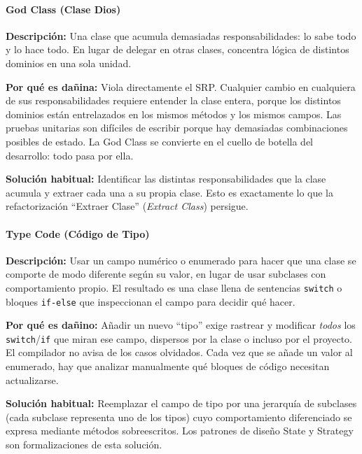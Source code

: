 \documentclass[11pt,a4paper]{article}
\newcommand{\code}[1]{\texttt{#1}}
\begin{document}
\label{sec:fund-god-class}
\paragraph{God Class (Clase Dios)}

\textbf{Descripción:} Una clase que acumula demasiadas responsabilidades:
lo sabe todo y lo hace todo.  En lugar de delegar en otras clases, concentra
lógica de distintos dominios en una sola unidad.

\textbf{Por qué es dañina:} Viola directamente el SRP.  Cualquier cambio en
cualquiera de sus responsabilidades requiere entender la clase entera, porque
los distintos dominios están entrelazados en los mismos métodos y los mismos
campos.  Las pruebas unitarias son difíciles de escribir porque hay demasiadas
combinaciones posibles de estado.  La God Class se convierte en el cuello de
botella del desarrollo: todo pasa por ella.

\textbf{Solución habitual:} Identificar las distintas responsabilidades que
la clase acumula y extraer cada una a su propia clase.  Esto es exactamente
lo que la refactorización ``Extraer Clase'' (\emph{Extract Class}) persigue.

\label{sec:fund-type-code}
\paragraph{Type Code (Código de Tipo)}

\textbf{Descripción:} Usar un campo numérico o enumerado para hacer que una
clase se comporte de modo diferente según su valor, en lugar de usar subclases
con comportamiento propio.  El resultado es una clase llena de sentencias
\code{switch} o bloques \code{if-else} que inspeccionan el campo para decidir
qué hacer.

\textbf{Por qué es dañino:} Añadir un nuevo ``tipo'' exige rastrear y
modificar \emph{todos} los \code{switch}/\code{if} que miran ese campo,
dispersos por la clase o incluso por el proyecto.  El compilador no avisa de
los casos olvidados.  Cada vez que se añade un valor al enumerado, hay que
analizar manualmente qué bloques de código necesitan actualizarse.

\textbf{Solución habitual:} Reemplazar el campo de tipo por una jerarquía de
subclases (cada subclase representa uno de los tipos) cuyo comportamiento
diferenciado se expresa mediante métodos sobreescritos.  Los patrones de diseño
State y Strategy son formalizaciones de esta solución.
\end{document}
